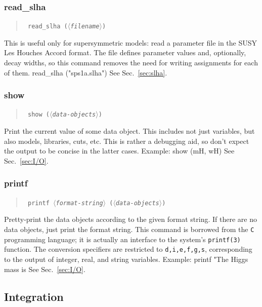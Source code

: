 \documentclass[12pt]{book}
\newenvironment{code}%
  {\begingroup\footnotesize
   \quote
   \verbatim}%
  {\endverbatim
   \endquote
   \endgroup\noindent}
\newenvironment{syntax}%
  {\begin{quote}
   \begin{flushleft}\tt}%
  {\end{flushleft}
   \end{quote}}
\newcommand{\var}[1]{$\langle$\textit{#1}$\rangle$}
\newcommand{\ttt}[1]{\texttt{#1}}
\begin{document}
\subsubsection{read\_slha}
\begin{syntax}
read\_slha (\var{filename})
\end{syntax}
This is useful only for supersymmetric models: read a parameter file
in the SUSY Les Houches Accord format.  The file defines parameter
values and, optionally, decay widths, so this command removes the need
for writing assignments for each of them.
\begin{code}
read_slha ("sps1a.slha")
\end{code}
See Sec.~\ref{sec:slha}.


\subsubsection{show}
\begin{syntax}
show (\var{data-objects})
\end{syntax}
Print the current value of some data object.  This includes not just
variables, but also models, libraries, cuts, etc.  This is rather a
debugging aid, so don't expect the output to be concise in the latter
cases.  Example:
\begin{code}
show (mH, wH)
\end{code}
See Sec.~\ref{sec:I/O}.


\subsubsection{printf}
\begin{syntax}
printf \var{format-string} (\var{data-objects})
\end{syntax}
Pretty-print the data objects according to the given format string.
If there are no data objects, just print the format string.
This command is borrowed from the \ttt{C} programming language; it is
actually an interface to the system's \ttt{printf(3)} function.  The
conversion specifiers are restricted to \ttt{d,i,e,f,g,s},
corresponding to the output of integer, real, and string variables.
Example:
\begin{code}
printf "The Higgs mass is %
\end{code}
See Sec.~\ref{sec:I/O}.


\subsection{Integration}
\end{document}
